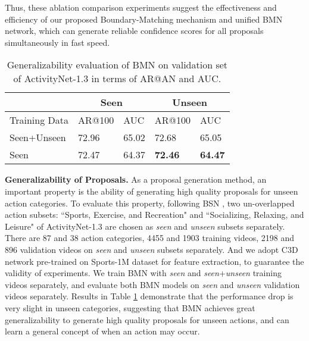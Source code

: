 \documentclass[10pt,twocolumn,letterpaper]{article}
\begin{document}
Thus, these ablation comparison experiments suggest the effectiveness and efficiency of our proposed Boundary-Matching mechanism and unified BMN network, which can generate reliable confidence scores for all proposals simultaneously in fast speed.



\begin{table}[tbp]
\setlength{\belowcaptionskip}{-0.5cm} \centering
\caption{  Generalizability evaluation of BMN on validation set of ActivityNet-1.3 in terms of AR@AN and AUC.  }
\small
\begin{tabular}{m{2.0cm}m{1.0cm}<{\centering}m{1.0cm}<{\centering}m{1.0cm}<{\centering}m{1.0cm}<{\centering}}
\toprule
 & \multicolumn{2}{c}{Seen } & \multicolumn{2}{c}{Unseen }  \\
\hline 
Training Data &  AR@100  & AUC & AR@100 & AUC \\
\hline 
Seen+Unseen 	& 72.96 & 65.02 & 72.68 & 65.05 \\
Seen  		    & 72.47 & 64.37 & {\bf 72.46} & {\bf 64.47} \\
\bottomrule
\end{tabular}
\label{table:gene}
\end{table}

\noindent
\textbf{Generalizability of Proposals.}
As a proposal generation method, an important property is the ability of generating high quality proposals for unseen action categories.
To evaluate this property, following BSN \cite{lin2018bsn}, two un-overlapped action subsets: ``Sports, Exercise, and Recreation" and ``Socializing, Relaxing, and Leisure" of ActivityNet-1.3 are chosen as \emph{seen} and \emph{unseen} subsets separately. There are 87 and 38 action categories, 4455 and 1903 training videos, 2198 and 896 validation videos on \emph{seen} and \emph{unseen} subsets separately.
And we adopt C3D network \cite{tran2017convnet} pre-trained on Sports-1M dataset \cite{sports1m} for feature extraction, to guarantee the validity of experiments.
We train BMN with \emph{seen} and \emph{seen}+\emph{unseen} training videos separately, and evaluate both BMN models on \emph{seen} and \emph{unseen} validation videos separately.
Results in Table \ref{table:gene} demonstrate that the performance drop is very slight in unseen categories, suggesting that BMN achieves great generalizability to generate high quality proposals for unseen actions, and can learn a general concept of when an action may occur.
\end{document}
